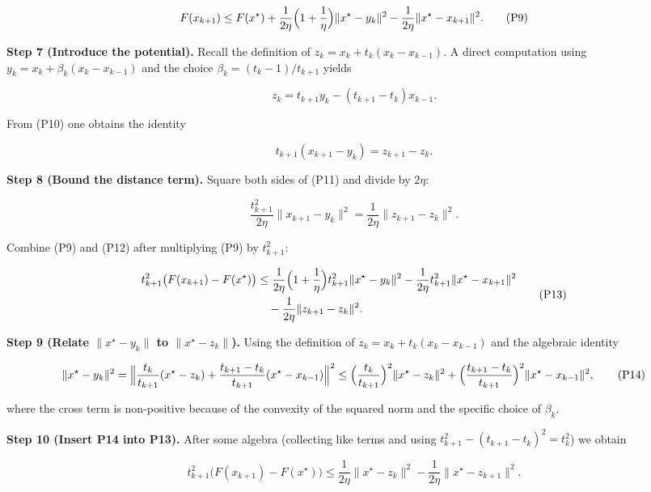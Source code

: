 \documentclass{article}
\begin{document}
\[
F(x_{k+1})\le F(x^{\star})+\frac{1}{2\eta}\Bigl(1+\frac{1}{\eta}\Bigr)\|x^{\star}-y_{k}\|^{2}
-\frac{1}{2\eta}\|x^{\star}-x_{k+1}\|^{2}.
\tag{P9}
\]

\bigskip
\noindent\textbf{Step 7 (Introduce the potential).}  
Recall the definition of $z_{k}=x_{k}+t_{k}(x_{k}-x_{k-1})$.
A direct computation using $y_{k}=x_{k}+ \beta_{k}(x_{k}-x_{k-1})$ and the
choice $\beta_{k}= (t_{k}-1)/t_{k+1}$ yields

\[
z_{k}=t_{k+1}y_{k}- (t_{k+1}-t_{k})x_{k-1}.
\tag{P10}
\]

From (P10) one obtains the identity  

\[
t_{k+1} (x_{k+1}-y_{k}) = z_{k+1}-z_{k}.
\tag{P11}
\]

\bigskip
\noindent\textbf{Step 8 (Bound the distance term).}  
Square both sides of (P11) and divide by $2\eta$:

\[
\frac{t_{k+1}^{2}}{2\eta}\|x_{k+1}-y_{k}\|^{2}
=\frac{1}{2\eta}\|z_{k+1}-z_{k}\|^{2}.
\tag{P12}
\]

Combine (P9) and (P12) after multiplying (P9) by $t_{k+1}^{2}$:

\[
\begin{aligned}
t_{k+1}^{2}\bigl(F(x_{k+1})-F(x^{\star})\bigr)
&\le \frac{1}{2\eta}\Bigl(1+\frac{1}{\eta}\Bigr)t_{k+1}^{2}\|x^{\star}-y_{k}\|^{2}
-\frac{1}{2\eta}t_{k+1}^{2}\|x^{\star}-x_{k+1}\|^{2}\\
&\quad -\frac{1}{2\eta}\|z_{k+1}-z_{k}\|^{2}.
\end{aligned}
\tag{P13}
\]

\bigskip
\noindent\textbf{Step 9 (Relate $\|x^{\star}-y_{k}\|$ to $\|x^{\star}-z_{k}\|$).}  
Using the definition of $z_{k}=x_{k}+t_{k}(x_{k}-x_{k-1})$ and the algebraic
identity  

\[
\|x^{\star}-y_{k}\|^{2}
= \Bigl\|\frac{t_{k}}{t_{k+1}}(x^{\star}-z_{k})+
\frac{t_{k+1}-t_{k}}{t_{k+1}}(x^{\star}-x_{k-1})\Bigr\|^{2}
\le \Bigl(\frac{t_{k}}{t_{k+1}}\Bigr)^{2}\|x^{\star}-z_{k}\|^{2}
+\Bigl(\frac{t_{k+1}-t_{k}}{t_{k+1}}\Bigr)^{2}\|x^{\star}-x_{k-1}\|^{2},
\tag{P14}
\]

where the cross term is non‑positive because of the convexity of the squared norm
and the specific choice of $\beta_{k}$.

\bigskip
\noindent\textbf{Step 10 (Insert P14 into P13).}  
After some algebra (collecting like terms and using $t_{k+1}^{2}
-(t_{k+1}-t_{k})^{2}=t_{k}^{2}$) we obtain

\[
t_{k+1}^{2}\bigl(F(x_{k+1})-F(x^{\star})\bigr)
\le \frac{1}{2\eta}\|x^{\star}-z_{k}\|^{2}
-\frac{1}{2\eta}\|x^{\star}-z_{k+1}\|^{2}.
\tag{P15}
\]
\end{document}
